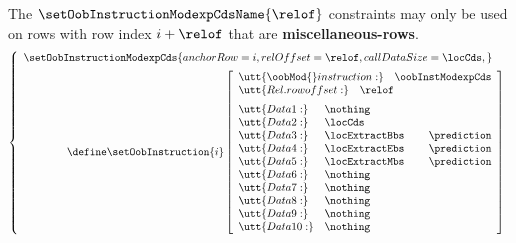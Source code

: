 \saNote{} The $\setOobInstructionModexpCdsName{\relof}$ constraints may only be used on rows with row index $i + \relof$ that are \textbf{miscellaneous-rows}.
\[
        \left\{ \begin{array}{l}
                \setOobInstructionModexpCds {
                        anchorRow    = i       ,
                        relOffset    = \relof  ,
                        callDataSize = \locCds ,
                        }
                \vspace{2mm} \\
                \qquad \qquad \define
                \setOobInstruction{i}
                \left[ \begin{array}{llr}
                        \multicolumn{3}{l}{\utt{\oobMod{} instruction:} \quad \oobInstModexpCds} \\
                        \multicolumn{3}{l}{\utt{Rel. row offset:}            \quad \relof}         \vspace{2mm} \\
                        \utt{Data 1:}  & \nothing       \\
                        \utt{Data 2:}  & \locCds        \\
                        \utt{Data 3:}  & \locExtractBbs  & \prediction \\
                        \utt{Data 4:}  & \locExtractEbs  & \prediction \\
                        \utt{Data 5:}  & \locExtractMbs  & \prediction \\
                        \utt{Data 6:}  & \nothing       \\
                        \utt{Data 7:}  & \nothing       \\
                        \utt{Data 8:}  & \nothing       \\
                        \utt{Data 9:}  & \nothing       \\
                        \utt{Data 10:} & \nothing       \\
                \end{array} \right] \\
        \end{array} \right.
\]
